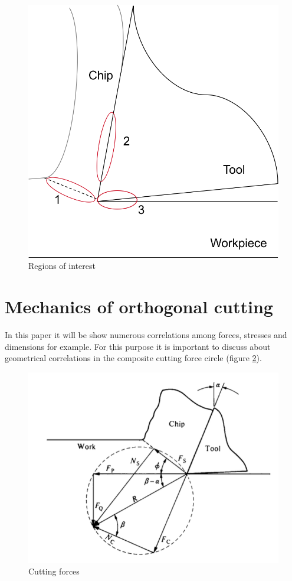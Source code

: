	\begin{figure}[h]
		\centering
		\captionsetup{justification=centering}
		\includegraphics[scale=0.5]{Imagens/heatZones.png}
		\caption{Regions of interest}
		\label{fig:heatZones}
	\end{figure}

	\section{Mechanics of orthogonal cutting}

	In this paper it will be show numerous correlations among forces, stresses and dimensions for example. For this purpose it is important to discuss about geometrical correlations in the composite cutting force circle (figure \ref{fig:circlec}).

	\begin{figure}[h]
		\centering
		\captionsetup{justification=centering}
		\includegraphics[scale=0.5]{Cap1/circlec.png}
		\caption{Cutting forces \cite{shaw2005metal}}
		\label{fig:circlec}
	\end{figure}

